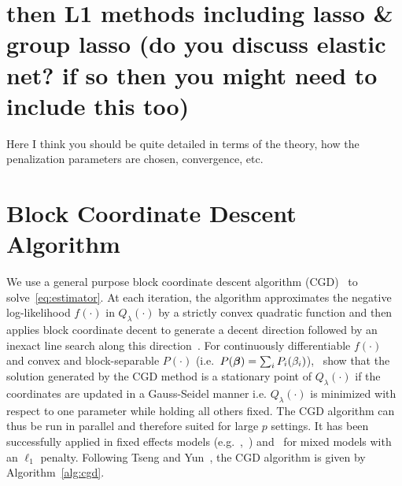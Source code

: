 


\section{then L1 methods including lasso \& group lasso (do you discuss elastic net? if so then you might need to include this too)}
Here I think you should be quite detailed in terms of the theory, how the penalization parameters are chosen, convergence, etc.



\section{Block Coordinate Descent Algorithm} \label{ap:cgd}

We use a general purpose block coordinate descent algorithm (CGD)~\citep{tseng2009coordinate} to solve~\eqref{eq:estimator}. At each iteration, the algorithm approximates the negative log-likelihood $f(\cdot)$ in $Q_{\lambda}(\cdot)$ by a strictly convex quadratic function and then applies block coordinate decent to generate a decent direction followed by an inexact line search along this direction~\citep{tseng2009coordinate}. For continuously differentiable $f(\cdot)$ and convex and block-separable $P(\cdot)$ \mbox{(i.e. $P(\boldsymbol{\beta}) = \sum_i P_i (\beta_i)$)},~\cite{tseng2009coordinate} show that the solution generated by the CGD method is a stationary point of $Q_{\lambda}(\cdot)$ if the coordinates are updated in a Gauss-Seidel manner i.e. $Q_{\lambda}(\cdot)$ is minimized with respect to one parameter while holding all others fixed. The CGD algorithm can thus be run in parallel and therefore suited for large $p$ settings. It has been successfully applied in fixed effects models (e.g.~\cite{meier2008group},~\cite{friedman2010regularization}) and~\cite{schelldorfer2011estimation} for mixed models with an $\ell_1$ penalty. Following Tseng and Yun~\cite{tseng2009coordinate}, the CGD algorithm is given by Algorithm~\ref{alg:cgd}.

